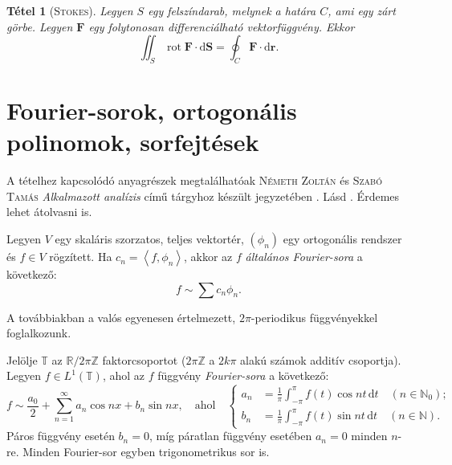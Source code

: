 \documentclass[%
	DIV=15,appendixprefix]{scrreprt}
\newtheorem*{tetel}{Tétel}
\theoremstyle{definition}
\theoremstyle{remark}
\DeclareMathOperator{\rot}{rot}
\begin{document}
\begin{tetel}[\textsc{Stokes}]
	Legyen $ S $ egy felszíndarab, melynek a határa $ C $, ami egy zárt görbe. Legyen
	$ \mathbf{ F }$ egy folytonosan differenciálható vektorfüggvény. Ekkor
	\begin{equation*}
		\iint_{ S } \rot \mathbf{ F } \cdot \mathrm{ d } \mathbf{ S } = \oint_{ C } \mathbf{F} \cdot
		\mathrm{ d } \mathbf{r}.
	\end{equation*}
\end{tetel}
%
\section{Fourier-sorok, ortogonális polinomok, sorfejtések}
A tételhez kapcsolódó anyagrészek megtalálhatóak \textsc{Németh Zoltán} és \textsc{Szabó Tamás}
\emph{Alkalmazott analízis} című tárgyhoz készült jegyzetében \cite{SzTNZ}.
%
Lásd \cite[1.3. és 1.6.~szakaszok]{SzTNZ}. Érdemes lehet átolvasni \cite[1.4. és
1.5.~szakaszokat]{SzTNZ} is.

Legyen $ V $ egy skaláris szorzatos, teljes vektortér, $ \left( \phi_{ n } \right) $ egy
ortogonális rendszer és $ f \in V $ rögzített. Ha $ c_{ n } = \left\langle f,{} \phi_{ n }
\right\rangle $, akkor az $ f $ \emph{általános Fourier-sora} a következő:
\begin{equation*}
	f \sim \sum c_{ n } \phi_{ n }.
\end{equation*}

A továbbiakban a valós egyenesen értelmezett, $ 2 \pi $-periodikus függvényekkel foglalkozunk.

Jelölje $ \mathbb{ T } $ az $ \mathbb{R} / 2 \pi \mathbb{ Z } $ faktorcsoportot ($ 2 \pi
\mathbb{Z} $ a $ 2 k \pi $ alakú számok additív csoportja). Legyen $ f \in L^{ 1 } \left(
\mathbb{ T } \right) $, ahol  az $ f $ függvény \emph{Fourier-sora} a következő:
\begin{equation*}
	f \sim \frac{ a_{ 0 }}{ 2 } + \sum_{ n = 1 }^{ \infty } a_{ n } \cos n x + b_{ n } \sin n x,
	\quad \text{ahol} \quad \left\{ \begin{aligned}
		a_{ n } &= \frac{ 1 }{ \pi } \int_{ - \pi }^{ \pi } f \left( t \right) \cos n t \,
		\mathrm{ d }
		t \quad \left( n \in \mathbb{ N }_{ 0 } \right);\\
		b_{ n } &= \frac{ 1 }{ \pi } \int_{ - \pi }^{ \pi } f \left( t \right) \sin n t \,
		\mathrm{ d }
		t \quad \left( n \in \mathbb{ N }\right).
	\end{aligned} \right.
\end{equation*}
Páros függvény esetén $ b_{ n } = 0 $, míg páratlan függvény esetében $ a_{ n } = 0 $ minden
$ n $-re. Minden Fourier-sor egyben trigonometrikus sor is.
\end{document}
